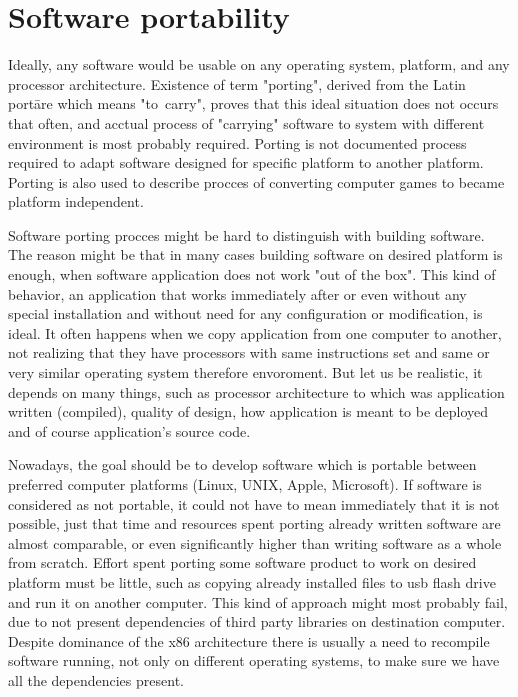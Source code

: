 \chapter{Software portability}\label{porting}

Ideally, any software would be usable on any operating system, platform, and any processor architecture.
Existence of term "porting", derived from the Latin portāre which means "to~carry", proves that this ideal situation does not occurs that often, and acctual process of "carrying" software to system with different environment is most probably required.
Porting is not documented process required to adapt software designed for specific platform to another platform.
Porting is also used to describe procces of converting computer games to became platform independent\cite{wiki_porting}.

Software porting procces might be hard to distinguish with building software.
The reason might be that in many cases building software on desired platform is enough, when software application does not work "out of the box".
This kind of behavior, an application that works immediately after or even without any special installation and without need for any configuration or modification, is ideal.
It often happens when we copy application from one computer to another, not realizing that they have processors with same instructions set and same or very similar operating system therefore envoroment.
But let us be realistic, it depends on many things, such as processor architecture to which was application written (compiled), quality of design, how application is meant to be deployed and of course application's source code.

Nowadays, the goal should be to develop software which is portable between preferred computer platforms (Linux, UNIX, Apple, Microsoft).
If software is considered as not portable, it could not have to mean immediately that it is not possible, just that time and resources spent porting already written software are almost comparable, or even significantly higher than writing software as a whole from scratch.
Effort spent porting some software product to work on desired platform must be little, such as copying already installed files to usb flash drive and run it on another computer.
This kind of approach might most probably fail, due to not present dependencies of third party libraries on destination computer.
Despite dominance of the x86 architecture there is usually a need to recompile software running, not only on different operating systems, to make sure we have all the dependencies present.

